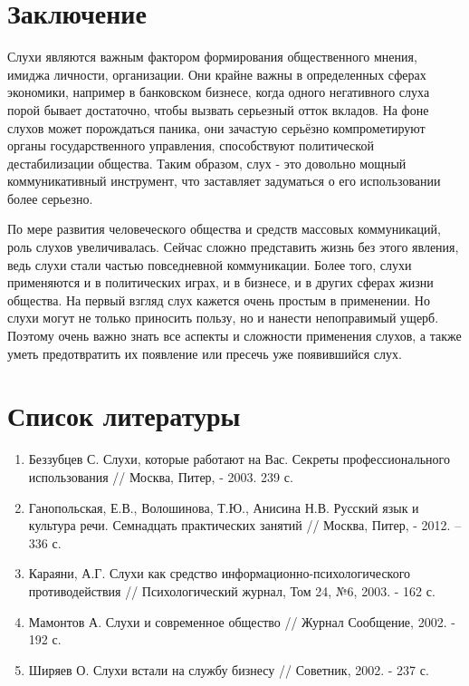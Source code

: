 \documentclass[a4paper,14pt,russian]{report}
\begin{document}
\section{Заключение}

Слухи являются важным фактором формирования общественного мнения, имиджа личности, организации. Они крайне важны в определенных сферах экономики, например в банковском бизнесе, когда одного негативного слуха порой бывает достаточно, чтобы вызвать серьезный отток вкладов. На фоне слухов может порождаться паника, они зачастую серьёзно компрометируют органы государственного управления, способствуют политической дестабилизации общества. Таким образом, слух - это довольно мощный коммуникативный инструмент, что заставляет задуматься о его использовании более серьезно.

По мере развития человеческого общества и средств массовых коммуникаций, роль слухов увеличивалась. Сейчас сложно представить жизнь без этого явления, ведь слухи стали частью повседневной коммуникации. Более того, слухи применяются и в политических играх, и в бизнесе, и в других сферах жизни общества. На первый взгляд слух кажется очень простым в применении. Но слухи могут не только приносить пользу, но и нанести непоправимый ущерб. Поэтому очень важно знать все аспекты и сложности применения слухов, а также уметь предотвратить их появление или пресечь уже появившийся слух.

\section{Список литературы}

\begin{enumerate}
  \item Беззубцев С. Слухи, которые работают на Вас. Секреты профессионального использования // Москва, Питер, - 2003. 239 с.
  \item Ганопольская, Е.В., Волошинова, Т.Ю., Анисина Н.В. Русский язык и культура речи. Семнадцать практических занятий // Москва, Питер, - 2012. – 336 с.
  \item Караяни, А.Г. Слухи как средство информационно-психологического противодействия // Психологический журнал, Том 24, №6, 2003. - 162 с.
  \item Мамонтов А. Слухи и современное общество // Журнал Сообщение, 2002. - 192 с.
  \item Ширяев О. Слухи встали на службу бизнесу // Советник, 2002. - 237 с.
\end{enumerate}
\end{document}
